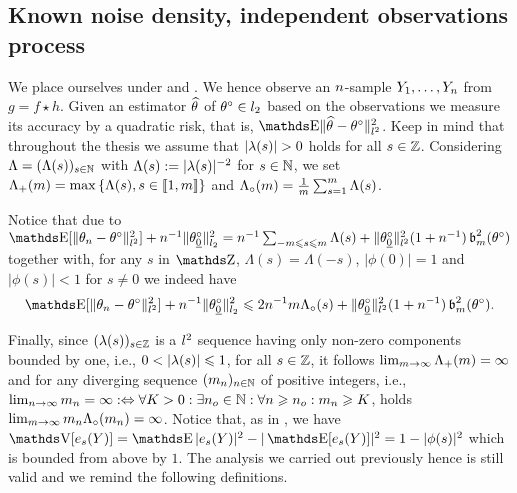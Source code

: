 \subsection{Known noise density, independent observations process}
\begin{te}
We place ourselves under  and .
We hence observe an \iid $\ssY$-sample $\rY_1,\dotsc,\rY_{\ssY}$ from $g = f \star h$.
Given an estimator $\hxdf[]$ of $\xdf\in\lp[2]$ based on the observations we measure its accuracy by a quadratic risk, that is, $\E\Vnormlp{\hxdf[]-\xdf}^2$.
Keep in mind that throughout the thesis we assume that $ \vert \fedf[(s)] \vert >0$ holds for all $s\in\Zz$.
Considering $\Lambda=\Nsuite{\iSv[s]}$ with $\iSv[s]:= \vert \fedf[(s)] \vert ^{-2}$ for $s\in\Nz$, we set $\miSv=\max\set{\iSv[s],s\in\nset{1,\Di}}$ and $\oiSv=\tfrac{1}{\Di}\sum_{s=1}^{\Di}\iSv[s]$.

Notice that due to $\E[\Vert \theta_{n} - \theta^{\circ} \Vert_{l^{2}}^{2}] + n^{-1} \Vert \theta^{\circ}_{\underline{0}} \Vert_{l_{2}}^{2} = n^{-1} \sum_{-m \leq s \leq m} \Lambda(s) + \Vert \theta^{\circ}_{\underline{0}} \Vert_{l^{2}}^{2}(1 + n^{-1})\b_{m}^{2}(\theta^{\circ})$
together with, for any $s$ in $\Z$, $\Lambda(s) = \Lambda(-s)$, $\vert \phi(0) \vert = 1$ and $\vert \phi(s) \vert < 1$ for $s \neq 0$ we indeed have
\[\E[\Vert \theta_{n} - \theta^{\circ} \Vert_{l^{2}}^{2}] + n^{-1} \Vert \theta^{\circ}_{\underline{0}} \Vert_{l_{2}}^{2} \leq 2 n^{-1} m \Lambda_{\circ}(s) + \Vert \theta^{\circ}_{\underline{0}} \Vert_{l^{2}}^{2}(1 + n^{-1})\b_{m}^{2}(\theta^{\circ}).\]

Finally, since
$\Zsuite[s]{\fedf[(s)]}$ is a $\lp^2$ sequence having only non-zero
components bounded by one, i.e., $0< \vert \fedf[(s)] \vert \leq1$, for all
$s\in\Zz$, it follows $\lim_{\Di\to\infty}\miSv=\infty$ and for any
diverging sequence $\Nsuite[\ssY]{\Di_{\ssY}}$ of positive integers,
i.e., $\lim_{\ssY\to\infty}\Di_{\ssY}=\infty:\Leftrightarrow\forall
K>0:\exists n_o\in\Nz:\forall n\geq n_o:\Di_n\geq K$, holds $\lim_{\Di\to\infty}\Di_{\ssY}\oiSv[\Di_{\ssY}]=\infty$.
Notice that, as in , we have $\V[e_{s}(Y)] = \E\vert e_{s}(Y) \vert^{2} - \vert \E[e_{s}(Y)] \vert^{2} = 1 - \vert \phi(s) \vert^{2}$ which is bounded from above by $1$.
The analysis we carried out previously hence is still valid and we remind the following definitions.
\end{te}

